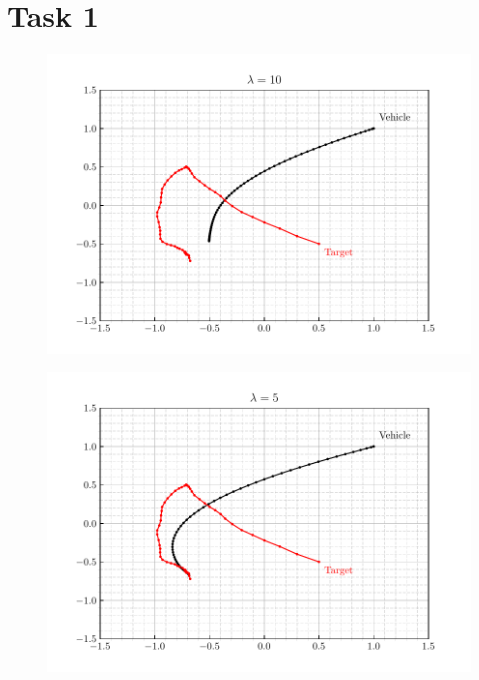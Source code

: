 \documentclass[12pt]{article}
\begin{document}
\thispagestyle{empty}

\setcounter{page}{0}

\newpage

\tableofcontents 

\newpage

\section{Task 1}

\begin{figure}[H]
    \centering
    \includegraphics{../../src/task_1/output/ex_1_i=1.pdf}
\end{figure}

\begin{figure}[H]
    \centering
    \includegraphics{../../src/task_1/output/ex_1_i=2.pdf}
\end{figure}
\end{document}
